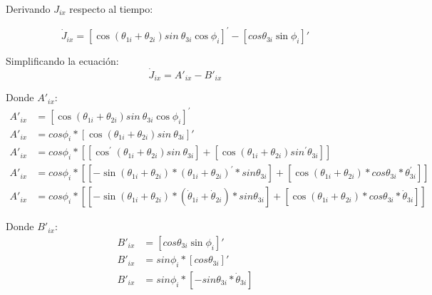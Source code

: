             Derivando $J_{ix}$ respecto al tiempo:

            \begin{equation*}
                 \dot{J}_{ix}= \left[ \cos  \left(  \theta _{1i}+ \theta _{2i} \right) sin~ \theta _{3i}\cos  \phi _{i} \right] ^{'}- \left[ cos  \theta _{3i}\sin  \phi _{i} \right] ' 
            \end{equation*}
            
            Simplificando la ecuación:
            \begin{equation*}
                \dot{J}_{ix}=A'_{ix}-B'_{ix}
            \end{equation*}
            
                        \newpage


            Donde   $A'_{ix}$:
            \begin{align*}
                 A'_{ix}&=  \left[ \cos  \left(  \theta _{1i}+ \theta _{2i} \right) sin~ \theta _{3i}\cos  \phi _{i} \right] ^{'} \\
                 A'_{ix}&= cos \phi _{i}\ast \left[ \cos  \left(  \theta _{1i}+ \theta _{2i} \right) sin~ \theta _{3i} \right] '  \\
                 A'_{ix}&= cos \phi _{i}\ast \left[  \left[ \cos ^{'} \left(  \theta _{1i}+ \theta _{2i} \right) sin~ \theta _{3i} \right] + \left[ \cos  \left(  \theta _{1i}+ \theta _{2i} \right) sin^{'} \theta _{3i} \right]  \right]  \\
                 A'_{ix}&= cos \phi _{i}\ast \left[  \left[ -\sin  \left(  \theta _{1i}+ \theta _{2i} \right) \ast \left(  \theta _{1i}+ \theta _{2i} \right) ^{'}\ast sin  \theta _{3i} \right]  + \left[ \cos  \left(  \theta _{1i}+ \theta _{2i} \right) \ast cos  \theta _{3i}\ast \theta ^{'}_{3i} \right]  \right]  \\
                 A'_{ix}&= cos \phi _{i}\ast \left[  \left[ -\sin  \left(  \theta _{1i}+ \theta _{2i} \right) \ast \left( \dot{ \theta }_{1i}+\dot{ \theta }_{2i} \right) \ast sin  \theta _{3i} \right]  + \left[ \cos  \left(  \theta _{1i}+ \theta _{2i} \right) \ast cos  \theta _{3i}\ast\dot{ \theta }_{3i} \right]  \right] 
            \end{align*}
            
            Donde $B'_{ix}$:
            \begin{align*}
                 B'_{ix}&= \left[ cos  \theta _{3i}\sin  \phi _{i} \right] ' \\
                 B'_{ix}&=sin \phi _{i}\ast \left[ cos  \theta _{3i} \right] ' \\
                 B'_{ix}&=sin \phi _{i}\ast \left[ -sin \theta _{3i}\ast\dot{ \theta }_{3i} \right]  
            \end{align*}

